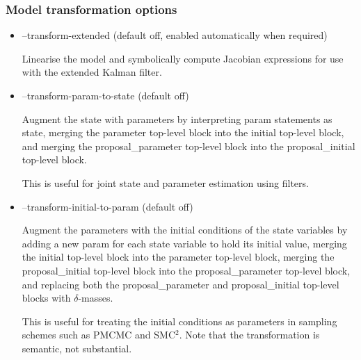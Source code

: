 \subsubsection{Model transformation options}
\begin{itemize}
\item {\sf --transform-extended} (default off, enabled automatically when
  required)

Linearise the model and symbolically compute Jacobian expressions for use with
the extended Kalman filter.

\item {\sf --transform-param-to-state} (default off)

Augment the state with parameters by interpreting {\sf param} statements as
{\sf state}, merging the {\sf parameter} top-level block into the {\sf
  initial} top-level block, and merging the {\sf proposal\_parameter}
top-level block into the {\sf proposal\_initial} top-level block.

This is useful for joint state and parameter estimation using filters.

\item {\sf --transform-initial-to-param} (default off)

Augment the parameters with the initial conditions of the state variables by
adding a new {\sf param} for each {\sf state} variable to hold its initial
value, merging the {\sf initial} top-level block into the {\sf parameter}
top-level block, merging the {\sf proposal\_initial} top-level block into the
{\sf proposal\_parameter} top-level block, and replacing both the {\sf
  proposal\_parameter} and {\sf proposal\_initial} top-level blocks with
$\delta$-masses.

This is useful for treating the initial conditions as parameters in sampling
schemes such as PMCMC and SMC$^2$. Note that the transformation is semantic,
not substantial.

\end{itemize}
